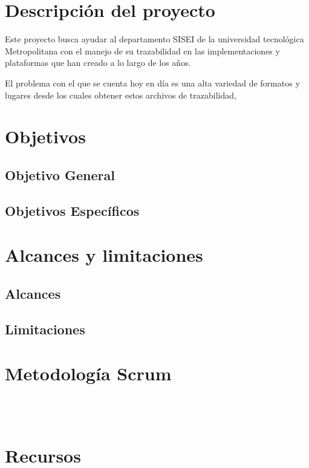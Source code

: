\section{Descripción del proyecto}

Este proyecto busca ayudar al departamento SISEI de la universidad tecnológica Metropolitana con el manejo de su trazabilidad en las implementaciones y plataformas que han creado a lo largo de los años.

El problema con el que se cuenta hoy en día es una alta variedad de formatos y lugares desde los cuales obtener estos archivos de trazabilidad,

\lipsum[2]

\section{Objetivos}
\subsection{Objetivo General}
\lipsum[1]

\subsection{Objetivos Específicos}

\section{Alcances y limitaciones}
\lipsum[3]
\subsection{Alcances}
\lipsum[4]
\subsection{Limitaciones}
\lipsum[5]
\section{Metodología Scrum}

\lipsum[10] \\
\lipsum[11] \\
\lipsum[12]

\clearpage

\section{Recursos}

